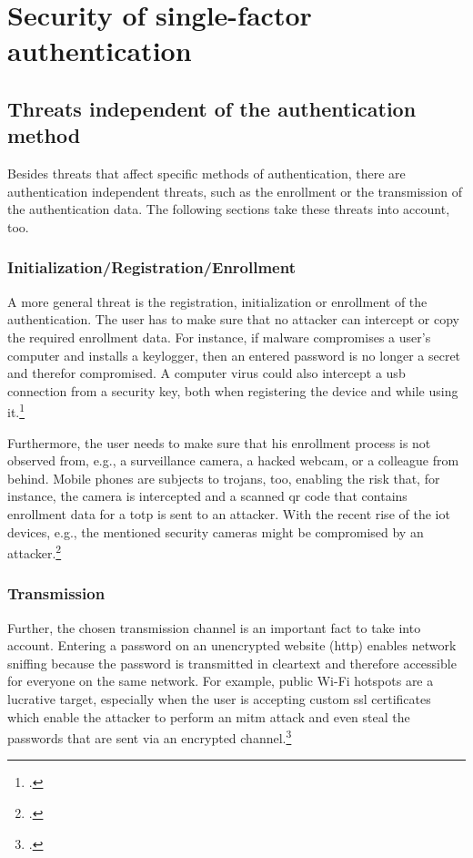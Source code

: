 \chapter{Security of single-factor authentication}
\label{chap:one-factor-security}

\section{Threats independent of the authentication method}

Besides threats that affect specific methods of authentication, there are authentication independent threats, such as the enrollment or the transmission of the authentication data. The following sections take these threats into account, too.

\subsection{Initialization/Registration/Enrollment}

A more general threat is the registration, initialization or enrollment of the authentication. The user has to make sure that no attacker can intercept or copy the required enrollment data. For instance, if malware compromises a user’s computer and installs a keylogger, then an entered password is no longer a secret and therefor compromised. A computer virus could also intercept a \gls{usb} connection from a security key, both when registering the device and while using it.\footcites[See][61]{Ulqinaku:2019:FPP:3317549.3323404}

Furthermore, the user needs to make sure that his enrollment process is not observed from, e.g., a surveillance camera, a hacked webcam, or a colleague from behind. Mobile phones are subjects to trojans, too, enabling the risk that, for instance, the camera is intercepted and a scanned \gls{qr} code that contains enrollment data for a \gls{totp} is sent to an attacker. With the recent rise of the \gls{iot} devices, e.g., the mentioned security cameras might be compromised by an attacker.\footcites[See][152--153]{10.1007/978-3-642-39235-1_9}[See][371--375]{10.1007/978-3-662-45472-5_24}

\subsection{Transmission}

Further, the chosen transmission channel is an important fact to take into account. Entering a password on an unencrypted website (\gls{http}) enables network sniffing because the password is transmitted in cleartext and therefore accessible for everyone on the same network. For example, public Wi-Fi hotspots are a lucrative target, especially when the user is accepting custom \gls{ssl} certificates which enable the attacker to perform an \gls{mitm} attack and even steal the passwords that are sent via an encrypted channel.\footcites[See][518]{10.1007/978-3-030-21548-4_28}

